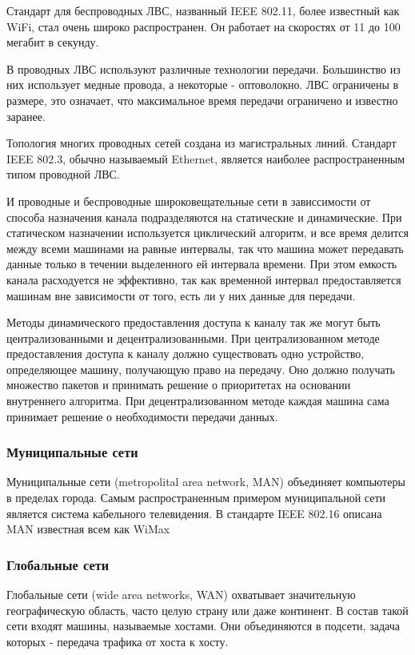     Стандарт для беспроводных ЛВС, названный IEEE 802.11, более известный как WiFi, стал очень широко распространен. Он работает на скоростях от 11 до 100 мегабит в секунду.

    В проводных ЛВС используют различные технологии передачи. Большинство из них использует медные провода, а некоторые - оптоволокно. ЛВС ограничены в размере, это означает, что максимальное время передачи ограничено и известно заранее.

    Топология многих проводных сетей создана из магистральных линий. Стандарт IEEE 802.3, обычно называемый Ethernet, является наиболее распространенным типом проводной ЛВС.

    И проводные и беспроводные широковещательные сети в зависсимости от способа назначения канала подразделяются на статические и динамические. При статическом назначении используется циклический алгоритм, и все время делится между всеми машинами на равные интервалы, так что машина может передавать данные только в течении выделенного ей интервала времени. При этом емкость канала расходуется не эффективно, так как временной интервал предоставляется машинам вне зависимости от того, есть ли у них данные для передачи.

    Методы динамического предоставления доступа к каналу так же могут быть централизованными и децентрализованными. При централизованном методе предоставления доступа к каналу должно существовать одно устройство, определяющее машину, получающую право на передачу. Оно должно получать множество пакетов и принимать решение о приоритетах на основании внутреннего алгоритма. При децентрализованном методе каждая машина сама принимает решение о необходимости передачи данных.


    \subsubsection{Муниципальные сети }
    Муниципальные сети (metropolital area network, MAN) объединяет компьютеры в пределах города. Самым распространенным примером муниципальной сети является система кабельного телевидения. В стандарте IEEE 802.16 описана MAN известная всем как WiMax

    \subsubsection{Глобальные сети }

    Глобальные сети (wide area networks, WAN) охватывает значительную географическую область, часто целую страну или даже континент. В состав такой сети входят машины, называемые хостами. Они объединяются в подсети, задача которых - передача трафика от хоста к хосту.

